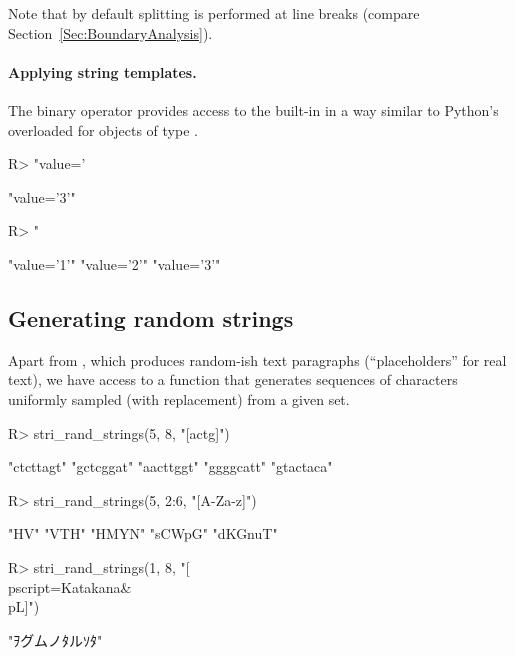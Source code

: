 \documentclass[nojss]{jss}
\begin{document}
Note that by default splitting is performed at line breaks
(compare Section~\ref{Sec:BoundaryAnalysis}).






\paragraph{Applying string templates.}
The binary operator  provides access to the built-in
 in a way similar to Python's \code{\%} overloaded
for objects of type .

\begin{Schunk}
\begin{Sinput}
R> "value='%d'" %s$% 3              # equivalently: "value='%d'" %s$% list(3)
\end{Sinput}
\begin{Soutput}
[1] "value='3'"
\end{Soutput}
\begin{Sinput}
R> "%s='%d'"    %s$% list("value", 1:3)
\end{Sinput}
\begin{Soutput}
[1] "value='1'" "value='2'" "value='3'"
\end{Soutput}
\end{Schunk}





\subsection{Generating random strings}

Apart from ,
which produces random-ish text paragraphs (``placeholders'' for real text),
we have access to a function that generates sequences of characters
uniformly sampled (with replacement) from a given set.

\begin{Schunk}
\begin{Sinput}
R> stri_rand_strings(5, 8, "[actg]")
\end{Sinput}
\begin{Soutput}
[1] "ctcttagt" "gctcggat" "aacttggt" "ggggcatt" "gtactaca"
\end{Soutput}
\begin{Sinput}
R> stri_rand_strings(5, 2:6, "[A-Za-z]")
\end{Sinput}
\begin{Soutput}
[1] "HV"     "VTH"    "HMYN"   "sCWpG"  "dKGnuT"
\end{Soutput}
\begin{Sinput}
R> stri_rand_strings(1, 8, "[\\p{script=Katakana}&\\p{L}]")
\end{Sinput}
\begin{Soutput}
[1] "ｦグムノﾀルｿﾀ"
\end{Soutput}
\end{Schunk}
\end{document}
